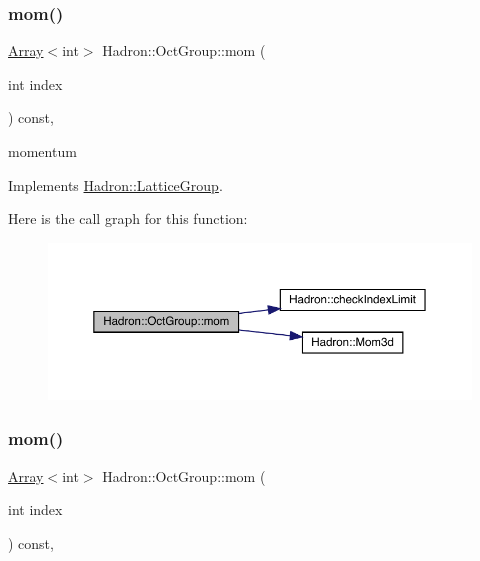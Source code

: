 \subsubsection{\texorpdfstring{mom()}{mom()}\hspace{0.1cm}{\footnotesize\ttfamily [1/3]}}
{\footnotesize\ttfamily \mbox{\hyperlink{classXMLArray_1_1Array}{Array}}$<$int$>$ Hadron\+::\+Oct\+Group\+::mom (\begin{DoxyParamCaption}\item[{int}]{index }\end{DoxyParamCaption}) const\hspace{0.3cm}{\ttfamily [inline]}, {\ttfamily [virtual]}}

momentum 

Implements \mbox{\hyperlink{structHadron_1_1LatticeGroup_ad577b65041dd9a6e84b1f3bd49cb8fce}{Hadron\+::\+Lattice\+Group}}.

Here is the call graph for this function\+:
\nopagebreak
\begin{figure}[H]
\begin{center}
\leavevmode
\includegraphics[width=350pt]{d1/de5/structHadron_1_1OctGroup_ab3c3d81d578cac614b1ccdd456f8ea59_cgraph}
\end{center}
\end{figure}
\mbox{\label{structHadron_1_1OctGroup_ab3c3d81d578cac614b1ccdd456f8ea59}} 
\subsubsection{\texorpdfstring{mom()}{mom()}\hspace{0.1cm}{\footnotesize\ttfamily [2/3]}}
{\footnotesize\ttfamily \mbox{\hyperlink{classXMLArray_1_1Array}{Array}}$<$int$>$ Hadron\+::\+Oct\+Group\+::mom (\begin{DoxyParamCaption}\item[{int}]{index }\end{DoxyParamCaption}) const\hspace{0.3cm}{\ttfamily [inline]}, {\ttfamily [virtual]}}

